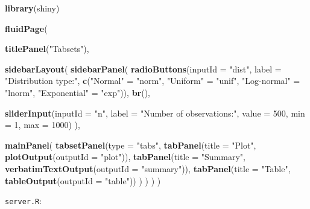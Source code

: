 \documentclass[]{book}
\newenvironment{Shaded}{\begin{snugshade}}{\end{snugshade}}
\newcommand{\KeywordTok}[1]{\textcolor[rgb]{0.13,0.29,0.53}{\textbf{#1}}}
\newcommand{\DataTypeTok}[1]{\textcolor[rgb]{0.13,0.29,0.53}{#1}}
\newcommand{\DecValTok}[1]{\textcolor[rgb]{0.00,0.00,0.81}{#1}}
\newcommand{\StringTok}[1]{\textcolor[rgb]{0.31,0.60,0.02}{#1}}
\newcommand{\NormalTok}[1]{#1}
\theoremstyle{definition}
\theoremstyle{definition}
\theoremstyle{definition}
\theoremstyle{remark}
\begin{document}
\begin{Shaded}
\begin{Highlighting}[]
\KeywordTok{library}\NormalTok{(shiny)}

\KeywordTok{fluidPage}\NormalTok{(}
    
  \KeywordTok{titlePanel}\NormalTok{(}\StringTok{"Tabsets"}\NormalTok{),}
  
  \KeywordTok{sidebarLayout}\NormalTok{(}
    \KeywordTok{sidebarPanel}\NormalTok{(}
      \KeywordTok{radioButtons}\NormalTok{(}\DataTypeTok{inputId =} \StringTok{"dist"}\NormalTok{, }
                   \DataTypeTok{label =} \StringTok{"Distribution type:"}\NormalTok{,}
                   \KeywordTok{c}\NormalTok{(}\StringTok{"Normal"}\NormalTok{ =}\StringTok{ "norm"}\NormalTok{,}
                     \StringTok{"Uniform"}\NormalTok{ =}\StringTok{ "unif"}\NormalTok{,}
                     \StringTok{"Log-normal"}\NormalTok{ =}\StringTok{ "lnorm"}\NormalTok{,}
                     \StringTok{"Exponential"}\NormalTok{ =}\StringTok{ "exp"}\NormalTok{)),}
      \KeywordTok{br}\NormalTok{(),}
      
      \KeywordTok{sliderInput}\NormalTok{(}\DataTypeTok{inputId =} \StringTok{"n"}\NormalTok{, }
                  \DataTypeTok{label =} \StringTok{"Number of observations:"}\NormalTok{, }
                   \DataTypeTok{value =} \DecValTok{500}\NormalTok{,}
                   \DataTypeTok{min =} \DecValTok{1}\NormalTok{, }
                   \DataTypeTok{max =} \DecValTok{1000}\NormalTok{)}
\NormalTok{    ),}
    
    \KeywordTok{mainPanel}\NormalTok{(}
      \KeywordTok{tabsetPanel}\NormalTok{(}\DataTypeTok{type =} \StringTok{"tabs"}\NormalTok{, }
        \KeywordTok{tabPanel}\NormalTok{(}\DataTypeTok{title =} \StringTok{"Plot"}\NormalTok{, }\KeywordTok{plotOutput}\NormalTok{(}\DataTypeTok{outputId =} \StringTok{"plot"}\NormalTok{)), }
        \KeywordTok{tabPanel}\NormalTok{(}\DataTypeTok{title =} \StringTok{"Summary"}\NormalTok{, }\KeywordTok{verbatimTextOutput}\NormalTok{(}\DataTypeTok{outputId =} \StringTok{"summary"}\NormalTok{)), }
        \KeywordTok{tabPanel}\NormalTok{(}\DataTypeTok{title =} \StringTok{"Table"}\NormalTok{, }\KeywordTok{tableOutput}\NormalTok{(}\DataTypeTok{outputId =} \StringTok{"table"}\NormalTok{))}
\NormalTok{      )}
\NormalTok{    )}
\NormalTok{  )}
\NormalTok{)}
\end{Highlighting}
\end{Shaded}

\texttt{server.R}:
\end{document}
